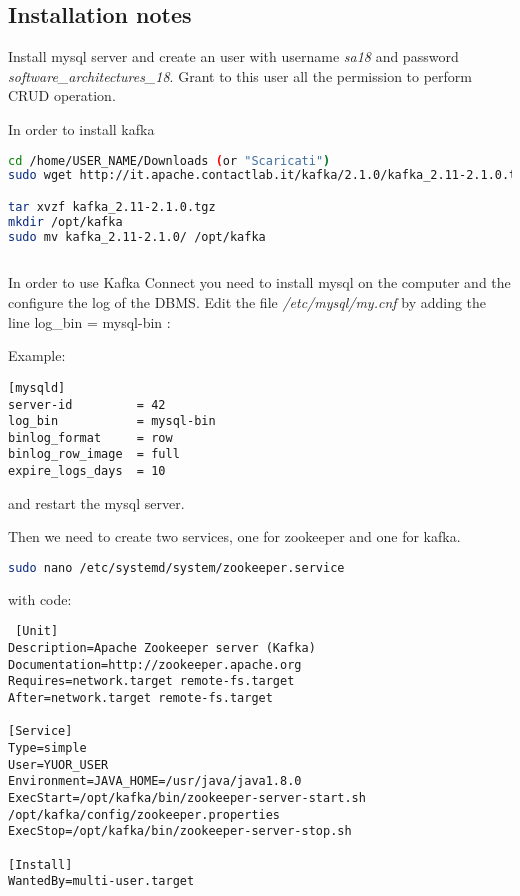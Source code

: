 \begin{appendices}
\chapter{Installation notes}

Install mysql server and create an user with username \textit{sa18} and password \textit{software\_architectures\_18}. Grant to this user all the permission to perform CRUD operation.

In order to install kafka
\begin{lstlisting}[language=bash]
cd /home/USER_NAME/Downloads (or "Scaricati")
sudo wget http://it.apache.contactlab.it/kafka/2.1.0/kafka_2.11-2.1.0.tgz

tar xvzf kafka_2.11-2.1.0.tgz
mkdir /opt/kafka
sudo mv kafka_2.11-2.1.0/ /opt/kafka
 
\end{lstlisting}

In order to use Kafka Connect you need to install mysql on the computer and the configure the log of the DBMS. 
Edit the file \textit{/etc/mysql/my.cnf} by adding the line log\_bin = mysql-bin :

Example:
\begin{lstlisting}
[mysqld]
server-id         = 42
log_bin           = mysql-bin
binlog_format     = row
binlog_row_image  = full
expire_logs_days  = 10
\end{lstlisting}

and restart the mysql server.

Then we need to create two services, one for zookeeper and one for kafka.

\begin{lstlisting}[language=bash]
sudo nano /etc/systemd/system/zookeeper.service
\end{lstlisting}
 with code:
 \begin{lstlisting}
 [Unit]
Description=Apache Zookeeper server (Kafka)
Documentation=http://zookeeper.apache.org
Requires=network.target remote-fs.target
After=network.target remote-fs.target

[Service]
Type=simple
User=YUOR_USER
Environment=JAVA_HOME=/usr/java/java1.8.0
ExecStart=/opt/kafka/bin/zookeeper-server-start.sh /opt/kafka/config/zookeeper.properties
ExecStop=/opt/kafka/bin/zookeeper-server-stop.sh

[Install]
WantedBy=multi-user.target

 \end{lstlisting}
 

\end{appendices}
